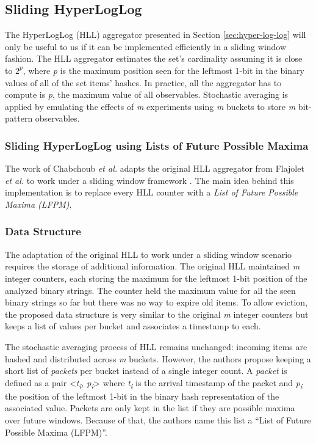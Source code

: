 \subsection{Sliding HyperLogLog}

The HyperLogLog (HLL) aggregator presented in Section \ref{sec:hyper-log-log} will only be useful to us if it can be implemented efficiently in a sliding window fashion. The HLL aggregator estimates the set's cardinality assuming it is close to $2^\textit{p}$, where \textit{p} is the maximum position seen for the leftmost 1-bit in the binary values of all of the set items' hashes. In practice, all the aggregator has to compute is \textit{p}, the maximum value of all observables. Stochastic averaging is applied by emulating the effects of \textit{m} experiments using \textit{m} buckets to store \textit{m} bit-pattern observables. 


\subsubsection{Sliding HyperLogLog using Lists of Future Possible Maxima} \label{sec:hll-lfpm}

The work of Chabchoub \emph{et al.} adapts the original HLL aggregator from Flajolet \emph{et al.} to work under a sliding window framework  \cite{Chabchoub-Sliding-HLL}.
The main idea behind this implementation is to replace every HLL counter with a \textit{List of Future Possible Maxima (LFPM)}.

\subsubsection*{Data Structure}

The adaptation of the original HLL to work under a sliding window scenario requires the storage of additional information. The original HLL maintained \textit{m} integer counters, each storing the maximum for the leftmost 1-bit position of the analyzed binary strings.  The counter held the maximum value for all the seen binary strings so far but there was no way to expire old items. To allow eviction, the proposed data structure is very similar to the original \textit{m} integer counters but keeps a list of values per bucket and associates a timestamp to each. 

The stochastic averaging process of HLL remains unchanged: incoming items are hashed and distributed across \textit{m} buckets. However, the authors propose keeping a short list of \textit{packets} per bucket instead of a single integer count. A \textit{packet} is defined as a pair <\textit{t\textsubscript{i}, p\textsubscript{i}}> where \textit{t\textsubscript{i}} is the arrival timestamp of the packet and \textit{p\textsubscript{i}} the position of the leftmost 1-bit in the binary hash representation of the associated value. Packets are only kept in the list if they are possible maxima over future windows. Because of that, the authors name this list a ``List of Future Possible Maxima (LFPM)''.

